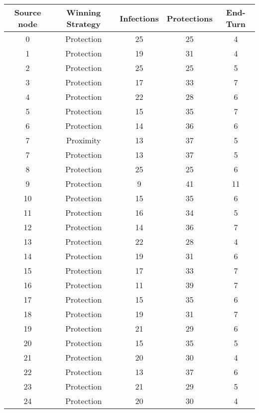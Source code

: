\documentclass[results.tex]{subfiles}
\begin{document}
\begin{center}
  \begin{tabular}{| c || c | c | c | c |}
    \hline
    {\bfseries Source node} & {\bfseries Winning Strategy} & {\bfseries Infections} & {\bfseries Protections} & {\bfseries End-Turn} \\  %
    \hline\hline
    0 & Protection & 25 & 25 & 4 \\ 
    \hline
    1 & Protection & 19 & 31 & 4 \\ 
    \hline
    2 & Protection & 25 & 25 & 5 \\ 
    \hline
    3 & Protection & 17 & 33 & 7 \\ 
    \hline
    4 & Protection & 22 & 28 & 6 \\ 
    \hline
    5 & Protection & 15 & 35 & 7 \\ 
    \hline
    6 & Protection & 14 & 36 & 6 \\ 
    \hline
    7 & Proximity & 13 & 37 & 5 \\ 
    \hline
    7 & Protection & 13 & 37 & 5 \\ 
    \hline
    8 & Protection & 25 & 25 & 6 \\ 
    \hline
    9 & Protection & 9 & 41 & 11 \\ 
    \hline
    10 & Protection & 15 & 35 & 6 \\ 
    \hline
    11 & Protection & 16 & 34 & 5 \\ 
    \hline
    12 & Protection & 14 & 36 & 7 \\ 
    \hline
    13 & Protection & 22 & 28 & 4 \\ 
    \hline
    14 & Protection & 19 & 31 & 6 \\ 
    \hline
    15 & Protection & 17 & 33 & 7 \\ 
    \hline
    16 & Protection & 11 & 39 & 7 \\ 
    \hline
    17 & Protection & 15 & 35 & 6 \\ 
    \hline
    18 & Protection & 19 & 31 & 7 \\ 
    \hline
    19 & Protection & 21 & 29 & 6 \\ 
    \hline
    20 & Protection & 15 & 35 & 5 \\ 
    \hline
    21 & Protection & 20 & 30 & 4 \\ 
    \hline
    22 & Protection & 13 & 37 & 6 \\ 
    \hline
    23 & Protection & 21 & 29 & 5 \\ 
    \hline
    24 & Protection & 20 & 30 & 4 \\ 

\end{tabular}
\end{center}
\end{document}
